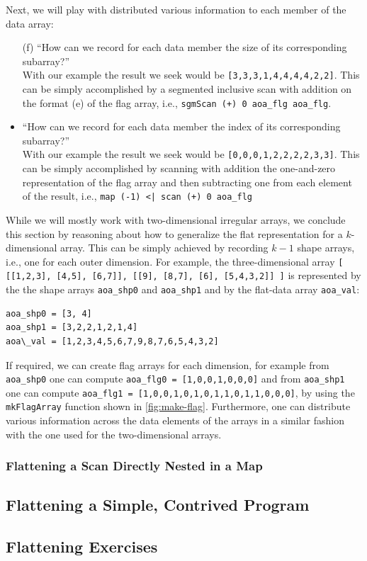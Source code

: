 \documentclass[acmsmall,review]{acmart}\settopmatter{printfolios=true,printccs=false,printacmref=false}
\begin{document}
Next, we will play with distributed various information
to each member of the data array:
\begin{itemize}
    \item[(f)] ``How can we record for each
                 data member the size of its corresponding subarray?''\\
                With our example the result we seek would be
                {\tt[3,3,3,1,4,4,4,4,2,2]}. This can be simply
                accomplished by a segmented inclusive scan with addition
                on the format (e) of the flag array, i.e.,
                \lstinline{sgmScan (+) 0 aoa_flg aoa_flg}.
   \item[(g)] ``How can we record for each
                 data member the index of its corresponding subarray?''\\
                With our example the result we seek would be
                {\tt[0,0,0,1,2,2,2,2,3,3]}. This can be simply
                accomplished by scanning with addition the
                one-and-zero representation of the flag array
                and then subtracting one from each element of
                the result, i.e., 
                \lstinline{map (-1) <| scan (+) 0 aoa_flg}
\end{itemize}

While we will mostly work with two-dimensional irregular arrays, 
we conclude this section by reasoning about how to generalize 
the flat representation for a $k$-dimensional array. This 
can be simply achieved by recording $k-1$ shape arrays,
i.e., one for each outer dimension.
For example, the three-dimensional array
{\tt [ [[1,2,3], [4,5], [6,7]], [[9], [8,7], [6], [5,4,3,2]] ]}
is represented by the the shape arrays {\tt aoa\_shp0} and
{\tt aoa\_shp1} and by the flat-data array {\tt aoa\_val}:
\begin{lstlisting}[mathescape=true]
aoa_shp0 = [3, 4]
aoa_shp1 = [3,2,2,1,2,1,4]
aoa\_val = [1,2,3,4,5,6,7,9,8,7,6,5,4,3,2]
\end{lstlisting}\vspace{-2ex}
If required, we can create flag arrays for each dimension,
for example from {\tt aoa\_shp0} one can compute
{\tt aoa\_flg0 = [1,0,0,1,0,0,0]} and from {\tt aoa\_shp1}
one can compute {\tt aoa\_flg1 = [1,0,0,1,0,1,0,1,1,0,1,1,0,0,0]},
by using the {\tt mkFlagArray} function shown in \cref{fig:make-flag}.
Furthermore, one can distribute various information across the 
data elements of the arrays in a similar fashion with the one 
used for the two-dimensional arrays.


\subsubsection{Flattening a Scan Directly Nested in a Map}
\label{subsubsec:scna-in-map} 




\subsection{Flattening a Simple, Contrived Program}
\label{subsec:flatten-simple-eg}


\subsection{Flattening Exercises}
\label{subsec:flat-exercises}



\newpage

\end{document}
